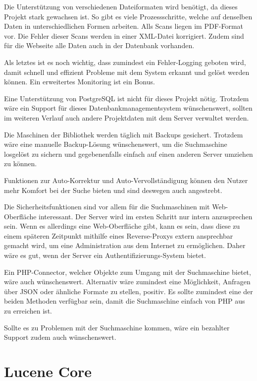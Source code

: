 Die Unterstützung von verschiedenen Dateiformaten wird benötigt, da dieses Projekt stark gewachsen ist. So gibt es viele Prozessschritte, welche auf denselben Daten in unterschiedlichen Formen arbeiten. Alls Scans liegen im PDF-Format vor. Die Fehler dieser Scans werden in einer XML-Datei korrigiert. Zudem sind für die Webseite alle Daten auch in der Datenbank vorhanden.

Als letztes ist es noch wichtig, dass zumindest ein Fehler-Logging geboten wird, damit schnell und effizient Probleme mit dem System erkannt und gelöst werden können. Ein erweitertes Monitoring ist ein Bonus.

Eine Unterstützung von PostgreSQL ist nicht für dieses Projekt nötig. Trotzdem wäre ein Support für dieses Datenbankmanagementsystem wünschenswert, sollten im weiteren Verlauf auch andere Projektdaten mit dem Server verwaltet werden. 

Die Maschinen der Bibliothek werden täglich mit Backups gesichert. Trotzdem wäre eine manuelle Backup-Lösung wünschenswert, um die Suchmaschine losgelöst zu sichern und gegebenenfalls einfach auf einen anderen Server umziehen zu können. 

Funktionen zur Auto-Korrektur und Auto-Vervollständigung können den Nutzer mehr Komfort bei der Suche bieten und sind deswegen auch angestrebt.

Die Sicherheitsfunktionen sind vor allem für die Suchmaschinen mit Web-Oberfläche interessant. Der Server wird im ersten Schritt nur intern anzusprechen sein. Wenn es allerdings eine Web-Oberfläche gibt, kann es sein, dass diese zu einem späteren Zeitpunkt mithilfe eines Reverse-Proxys extern ansprechbar gemacht wird, um eine Administration aus dem Internet zu ermöglichen. Daher wäre es gut, wenn der Server ein Authentifizierungs-System bietet.

Ein PHP-Connector, welcher Objekte zum Umgang mit der Suchmaschine bietet, wäre auch wünschenswert. Alternativ wäre zumindest eine Möglichkeit, Anfragen über JSON oder ähnliche Formate zu stellen, positiv. Es sollte zumindest eine der beiden Methoden verfügbar sein, damit die Suchmaschine einfach von PHP aus zu erreichen ist.

Sollte es zu Problemen mit der Suchmaschine kommen, wäre ein bezahlter Support zudem auch wünschenswert.

\section{Lucene Core}
\label{lucenecore}

